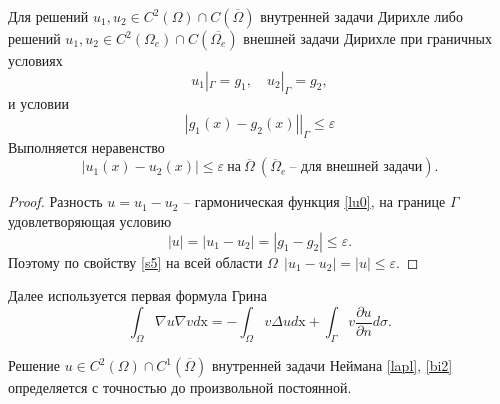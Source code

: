     \begin{theorem}
        Для решений \(u_1, u_2 \in C^2 (\Omega)  \cap C ( \overline{\Omega} )  \) внутренней задачи Дирихле либо решений \(u_1, u_2 \in C^2 (\Omega_e)  \cap C ( \overline{\Omega_e} ) \) внешней задачи Дирихле при граничных условиях
        $$ u_1|_\Gamma = g_1, \quad u_2|_\Gamma = g_2, $$
        и условии
        $$ \left. | g_1(x) - g_2(x) | \right|_\Gamma \leq \varepsilon $$
        Выполняется неравенство
        $$ | u_1(x) - u_2(x) | \leq \varepsilon ~\text{на}~ \overline{\Omega} ~ (\overline{\Omega}_e ~\text{-- для внешней задачи}). $$
    \end{theorem}

    \begin{proof}
        Разность $u = u_1 - u_2$ -- гармоническая функция \eqref{lu0}, на границе $\Gamma$ удовлетворяющая условию 
        $$ |u| = |u_1 - u_2| = |g_1 - g_2| \leq \varepsilon. $$
        Поэтому по свойству \ref{s5} на всей области $\Omega ~~ |u_1 - u_2| = |u| \leq \varepsilon $. 
    \end{proof}

    \begin{remark}
        Далее используется первая формула Грина 
        \begin{equation}
            \int_\Omega \nabla u \nabla v d\mathrm{x} = -\int_\Omega v \Delta u d\mathrm{x} + \int_\Gamma v \frac{\partial u}{\partial n} d\sigma. \label{green}
        \end{equation}
    \end{remark}

    \begin{theorem}
        Решение \(u \in C^2 (\Omega)  \cap C^1 ( \overline{\Omega} )  \) внутренней задачи Неймана \eqref{lapl}, \eqref{bi2} определяется с точностью до произвольной постоянной.
    \end{theorem}

